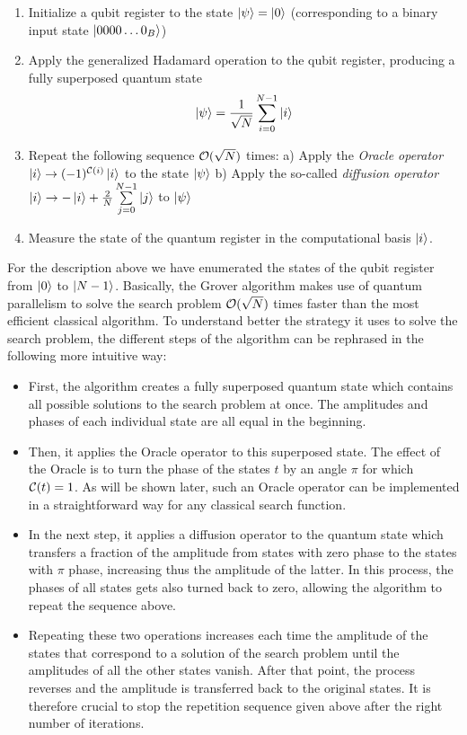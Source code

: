 \begin{enumerate}
 \item Initialize a qubit register to the state $\left| \psi \right> = \left| 0 \right>$ (corresponding to a binary input state $\left| 0000\hdots0_B \right>$)
 \item Apply the generalized Hadamard operation to the qubit register, producing a fully superposed quantum state $$\left| \psi \right> = \frac{1}{\sqrt{N}}\sum\limits_{i=0}^{N-1} \left| i \right>$$
 \item Repeat the following sequence $\begin{mathcal}O\end{mathcal}(\sqrt{N})$ times:
 \subitem a) Apply the {\it Oracle operator} $\ket{i}\to (-1)^{\Or(i)}\ket{i}$ to the state $\left| \psi \right>$
 \subitem b) Apply the so-called {\it diffusion operator} $\left| i \right> \to -\left| i \right>+\frac{2}{N}\sum\limits_{j=0}^{N-1}\left| j \right>$ to $\left| \psi \right>$
	\item Measure the state of the quantum register in the computational basis $\left| i \right>$.
\end{enumerate}

For the description above we have enumerated the states of the qubit register from $\left| 0 \right>$ to $\left| N-1 \right>$. Basically, the Grover algorithm makes use of quantum parallelism to solve the search problem $\begin{mathcal}O\end{mathcal}(\sqrt{N})$ times faster than the most efficient classical algorithm. To understand better the strategy it uses to solve the search problem, the different steps of the algorithm can be rephrased in the following more intuitive way:

\begin{itemize}
\item First, the algorithm creates a fully superposed quantum state which contains all possible solutions to the search problem at once. The amplitudes and phases of each individual state are all equal in the beginning.
\item Then, it applies the Oracle operator to this superposed state. The effect of the Oracle is to turn the phase of the states $t$ by an angle $\pi$ for which $\Or(t)=1$. As will be shown later, such an Oracle operator can be implemented in a straightforward way for any classical search function.
\item In the next step, it applies a diffusion operator to the quantum state which transfers a fraction of the amplitude from states with zero phase to the states with $\pi$ phase, increasing thus the amplitude of the latter. In this process, the phases of all states gets also turned back to zero, allowing the algorithm to repeat the sequence above.
\item Repeating these two operations increases each time the amplitude of the states that correspond to a solution of the search problem until the amplitudes of all the other states vanish. After that point, the process reverses and the amplitude is transferred back to the original states. It is therefore crucial to stop the repetition sequence given above after the right number of iterations.
\end{itemize}

